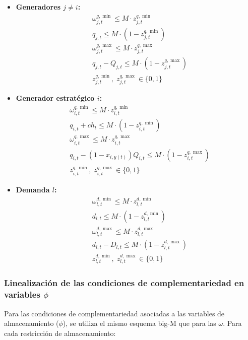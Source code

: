 \documentclass[a4paper,11pt]{article}
\begin{document}
\begin{itemize}
    \item \textbf{Generadores $j \neq i$:}
    \begin{align}
        &\omega^{q,\min}_{j,t} \leq M \cdot z^{q,\min}_{j,t} \\
        &q_{j,t} \leq M \cdot (1 - z^{q,\min}_{j,t}) \\
        &\omega^{q,\max}_{j,t} \leq M \cdot z^{q,\max}_{j,t} \\
        &q_{j,t} - Q_{j,t} \leq M \cdot (1 - z^{q,\max}_{j,t}) \\
        &z^{q,\min}_{j,t},\; z^{q,\max}_{j,t} \in \{0,1\}
    \end{align}
    \item \textbf{Generador estratégico $i$:}
    \begin{align}
        &\omega^{q,\min}_{i,t} \leq M \cdot z^{q,\min}_{i,t} \\
        &q_{i,t} + ch_t \leq M \cdot (1 - z^{q,\min}_{i,t}) \\
        &\omega^{q,\max}_{i,t} \leq M \cdot z^{q,\max}_{i,t} \\
        &q_{i,t} - (1-x_{i,y(t)}) Q_{i,t} \leq M \cdot (1 - z^{q,\max}_{i,t}) \\
        &z^{q,\min}_{i,t},\; z^{q,\max}_{i,t} \in \{0,1\}
    \end{align}
    \item \textbf{Demanda $l$:}
    \begin{align}
        &\omega^{d,\min}_{l,t} \leq M \cdot z^{d,\min}_{l,t} \\
        &d_{l,t} \leq M \cdot (1 - z^{d,\min}_{l,t}) \\
        &\omega^{d,\max}_{l,t} \leq M \cdot z^{d,\max}_{l,t} \\
        &d_{l,t} - D_{l,t} \leq M \cdot (1 - z^{d,\max}_{l,t}) \\
        &z^{d,\min}_{l,t},\; z^{d,\max}_{l,t} \in \{0,1\}
    \end{align}
\end{itemize}

\subsubsection{Linealización de las condiciones de complementariedad en variables $\phi$}

Para las condiciones de complementariedad asociadas a las variables de almacenamiento ($\phi$), se utiliza el mismo esquema big-M que para las $\omega$. Para cada restricción de almacenamiento:
\end{document}
